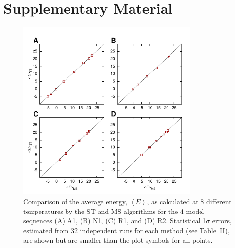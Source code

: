 \documentclass[12]{article}
\begin{document}
\section*{\LARGE{\textbf{Supplementary Material}}}

\begin{figure}[h]
\includegraphics[width=0.8\textwidth,center]{meanE}
\caption{ Comparison of the average energy, $\left < E\right >$, as calculated at 8 different temperatures by the ST and MS algorithms for the 4 model sequences (A) A1, (B) N1, (C) R1, and (D) R2. Statistical 1$\sigma$ errors, estimated from 32 independent runs for each method (see Table~II), are shown but are smaller than the plot symbols for all points.}
\end{figure}
\end{document}
